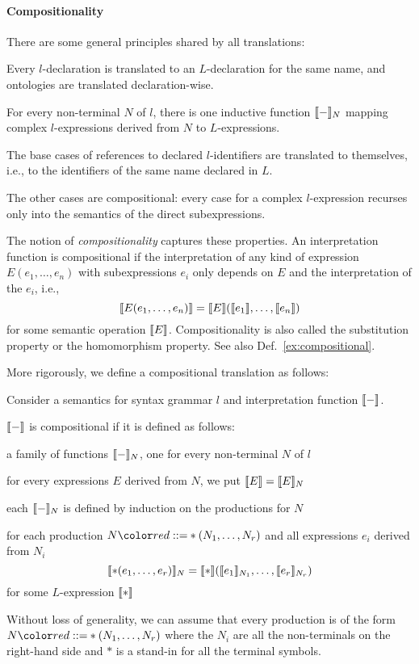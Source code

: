 \paragraph{Compositionality}
There are some general principles shared by all translations:
\begin{compactitem}
 \item Every $l$-declaration is translated to an $L$-declaration for the same name, and ontologies are translated declaration-wise.
 \item For every non-terminal $N$ of $l$, there is one inductive function $\llbracket -\rrbracket_N$ mapping complex $l$-expressions derived from $N$ to $L$-expressions.
 \item The base cases of references to declared $l$-identifiers are translated to themselves, i.e., to the identifiers of the same name declared in $L$.
 \item The other cases are compositional: every case for a complex $l$-expression recurses only into the semantics of the direct subexpressions.
\end{compactitem}

The notion of \emph{compositionality} captures these properties.
An interpretation function is compositional if the interpretation of any kind of expression $E(e_1,\ldots,e_n)$ with subexpressions $e_i$ only depends on $E$ and the interpretation of the $e_i$, i.e., \[\llbracket E(e_1,\ldots,e_n)\rrbracket=\llbracket E\rrbracket(\llbracket e_1\rrbracket,\ldots,\llbracket e_n\rrbracket)\] for some semantic operation $\llbracket E\rrbracket$.
Compositionality is also called the substitution property or the homomorphism property.
See also Def.~\ref{ex:compositional}.

More rigorously, we define a compositional translation as follows:
\begin{definition}
Consider a semantics for syntax grammar $l$ and interpretation function $\llbracket -\rrbracket$.

$\llbracket -\rrbracket$ is compositional if it is defined as follows:
\begin{compactitem}
 \item a family of functions $\llbracket -\rrbracket_N$, one for every non-terminal $N$ of $l$
 \item for every expressions $E$ derived from $N$, we put $\llbracket E\rrbracket=\llbracket E\rrbracket_N$
 \item each $\llbracket -\rrbracket_N$ is defined by induction on the productions for $N$
 \item for each production $N\bbc *(N_1,\ldots,N_r)$ and all expressions $e_i$ derived from $N_i$
   \[\llbracket *(e_1,\ldots,e_r)\rrbracket_N=\llbracket *\rrbracket(\llbracket e_1\rrbracket_{N_1},\ldots,\llbracket e_r\rrbracket_{N_r})\]
   for some $L$-expression $\llbracket *\rrbracket$
\end{compactitem}

Without loss of generality, we can assume that every production is of the form $N\bbc *(N_1,\ldots,N_r)$ where the $N_i$ are all the non-terminals on the right-hand side and $*$ is a stand-in for all the terminal symbols.
\end{definition}

